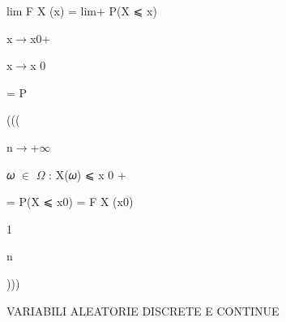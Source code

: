 \documentclass[a4paper,portrait,12pt]{article}
\begin{document}
\begin{flushleft}
lim F X (x) = lim+ P(X ⩽ x)
\end{flushleft}





\begin{flushleft}
x$\rightarrow$x0+
\end{flushleft}





\begin{flushleft}
x$\rightarrow$x 0
\end{flushleft}





\begin{flushleft}
= P
\end{flushleft}





(((





\begin{flushleft}
n$\rightarrow$+$\infty$
\end{flushleft}





\begin{flushleft}
𝜔 $\in$ $\Omega$ : X(𝜔) ⩽ x 0 +
\end{flushleft}





\begin{flushleft}
= P(X ⩽ x0) = F X (x0)
\end{flushleft}





1


\begin{flushleft}
n
\end{flushleft}





)))





\begin{flushleft}
 VARIABILI ALEATORIE DISCRETE E CONTINUE
\end{flushleft}
\end{document}
